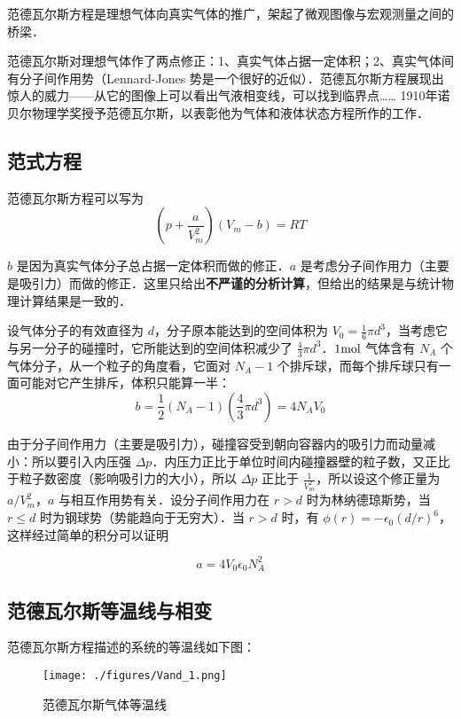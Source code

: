 
范德瓦尔斯方程是理想气体向真实气体的推广，架起了微观图像与宏观测量之间的桥梁．

范德瓦尔斯对理想气体作了两点修正：1、真实气体占据一定体积；2、真实气体间有分子间作用势（Lennard-Jones 势是一个很好的近似）．范德瓦尔斯方程展现出惊人的威力——从它的图像上可以看出气液相变线，可以找到临界点…… 1910年诺贝尔物理学奖授予范德瓦尔斯，以表彰他为气体和液体状态方程所作的工作．

\subsection{范式方程}
范德瓦尔斯方程可以写为
\begin{equation}
\left(p+\frac{a}{V_m^2}\right)(V_m-b)=RT
\end{equation}

$b$ 是因为真实气体分子总占据一定体积而做的修正．$a$ 是考虑分子间作用力（主要是吸引力）而做的修正．这里只给出\textbf{不严谨的分析计算}，但给出的结果是与统计物理计算结果是一致的．

设气体分子的有效直径为 $d$，分子原本能达到的空间体积为 $V_0=\frac{1}{6}\pi d^3$，当考虑它与另一分子的碰撞时，它所能达到的空间体积减少了 $\frac{4}{3}\pi d^3$．$1\rm mol$ 气体含有 $N_A$ 个气体分子，从一个粒子的角度看，它面对 $N_A-1$ 个排斥球，而每个排斥球只有一面可能对它产生排斥，体积只能算一半：
\begin{equation}
b=\frac{1}{2}(N_A-1)(\frac{4}{3}\pi d^3)=4N_A V_0
\end{equation}

由于分子间作用力（主要是吸引力），碰撞容受到朝向容器内的吸引力而动量减小：所以要引入内压强 $\Delta p$．内压力正比于单位时间内碰撞器壁的粒子数，又正比于粒子数密度（影响吸引力的大小），所以 $\Delta p$ 正比于 $\frac{1}{V_m^2}$，所以设这个修正量为 $a/V_m^2$，$a$ 与相互作用势有关．设分子间作用力在 $r>d$ 时为林纳德琼斯势，当 $r\le d$ 时为钢球势（势能趋向于无穷大）．当 $r>d$ 时，有 $\phi(r)=-\epsilon_0(d/r)^6$，这样经过简单的积分可以证明

\begin{equation}
a=4V_0\epsilon_0 N_A^2
\end{equation}

\subsection{范德瓦尔斯等温线与相变}
范德瓦尔斯方程描述的系统的等温线如下图：
\begin{figure}[ht]
\centering
\texttt{[image: ./figures/Vand\_1.png]}
\caption{范德瓦尔斯气体等温线} \label{Vand_fig1}
\end{figure}

